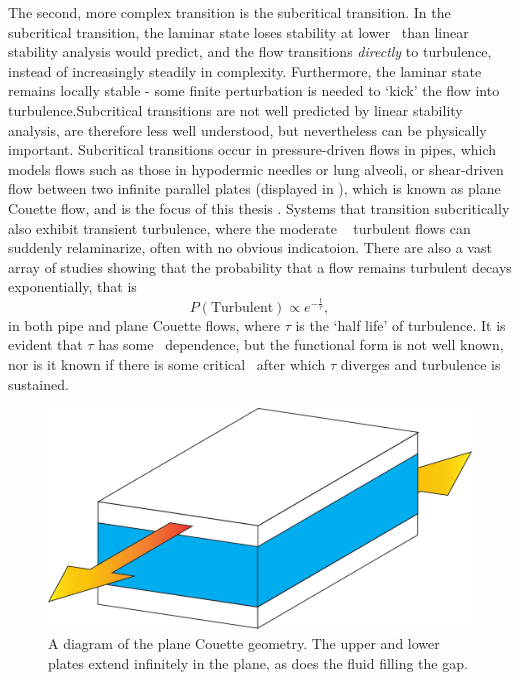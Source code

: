 The second, more complex transition is the subcritical transition. In the subcritical transition, the laminar state loses stability at lower \ReN~than linear stability analysis would predict, and the flow transitions \emph{directly} to turbulence, instead of increasingly steadily in complexity. Furthermore, the laminar state remains locally stable - some finite perturbation is needed to `kick' the flow into turbulence.Subcritical transitions are not well predicted by linear stability analysis, are therefore less well understood, but nevertheless can be physically important. Subcritical transitions occur in pressure-driven flows in pipes, which models flows such as those in hypodermic needles or lung alveoli, or shear-driven flow between two infinite parallel plates (displayed in ), which is known as plane Couette flow, and is the focus of this thesis . Systems that transition subcritically also exhibit transient turbulence, where the moderate \ReN~ turbulent flows can suddenly relaminarize, often with no obvious indicatoion. There are also a vast array of studies showing that the probability that a flow remains turbulent decays exponentially, that is
\begin{equation}
P(\textrm{Turbulent}) \propto e^{-\frac{t}{\tau}},
\end{equation}
in both pipe and plane Couette flows, where $\tau$ is the `half life' of turbulence. It is evident that $\tau$ has some \ReN~dependence, but the functional form is not well known, nor is it known if there is some critical \ReN~after which $\tau$ diverges and turbulence is sustained. 
\begin{figure}
\centerline{
\includegraphics[scale=0.4]{Figs/planeCouetteDiagram}}
\caption{A diagram of the plane Couette geometry. The upper and lower plates extend infinitely in the plane, as does the fluid filling the gap.}\label{fig:planeCouette}
\end{figure}

